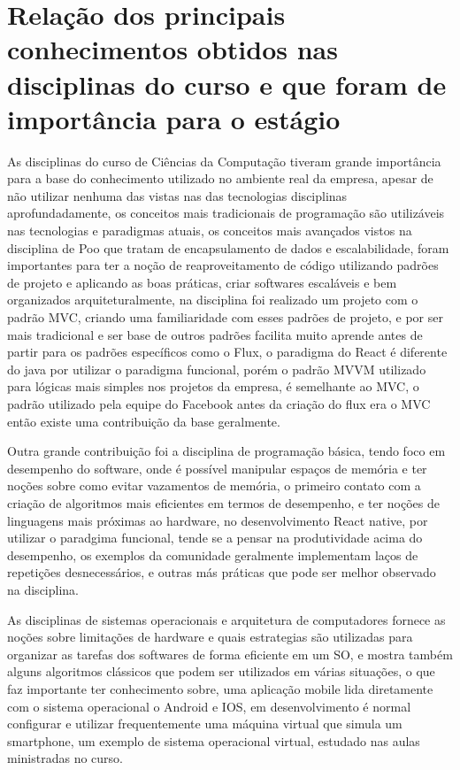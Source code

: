 \documentclass{ufersa}
\begin{document}
\section{Relação dos principais conhecimentos obtidos nas disciplinas do curso e que foram de importância para o estágio}
As disciplinas do curso de Ciências da Computação tiveram grande importância para a base do conhecimento utilizado no ambiente real da empresa, apesar de não utilizar nenhuma das vistas nas das tecnologias disciplinas aprofundadamente, os conceitos mais tradicionais de programação são utilizáveis nas tecnologias e paradigmas atuais,  os conceitos mais avançados vistos na disciplina de Poo que tratam de encapsulamento de dados e escalabilidade, foram importantes para ter a noção de reaproveitamento de código utilizando padrões de projeto e aplicando as boas práticas,  criar softwares escaláveis e bem organizados arquiteturalmente, na disciplina foi realizado um projeto com o padrão MVC, criando  uma familiaridade com esses padrões de projeto, e por ser mais tradicional e ser base de outros padrões facilita muito aprende antes de partir para os padrões específicos como o Flux, o paradigma do React é diferente do java por utilizar o paradigma funcional, porém o padrão MVVM utilizado para lógicas mais simples nos projetos da empresa, é semelhante ao MVC, o padrão utilizado pela equipe do Facebook antes da criação do flux era o MVC então existe uma contribuição da base geralmente. 

Outra grande contribuição foi a disciplina de programação básica, tendo foco em desempenho do software, onde é possível manipular espaços de memória e ter noções sobre como evitar vazamentos de memória, o primeiro contato com a criação de algoritmos mais eficientes em termos de desempenho, e ter noções de linguagens mais próximas ao hardware, no desenvolvimento React native, por utilizar o paradgima funcional, tende se a pensar na produtividade acima do desempenho, os exemplos da comunidade geralmente implementam laços de repetições desnecessários, e outras más práticas que pode ser melhor observado na disciplina.

As disciplinas de sistemas operacionais e arquitetura de computadores fornece as noções sobre limitações de hardware e quais estrategias são utilizadas para organizar as tarefas dos softwares de forma eficiente em um SO, e mostra também alguns algoritmos clássicos que podem ser utilizados em várias situações, o que faz importante ter conhecimento sobre, uma aplicação mobile lida diretamente com o sistema operacional o Android e IOS, em desenvolvimento é normal configurar e utilizar frequentemente uma máquina virtual que simula um smartphone, um exemplo de sistema operacional virtual, estudado nas aulas ministradas no curso.  
\end{document}
